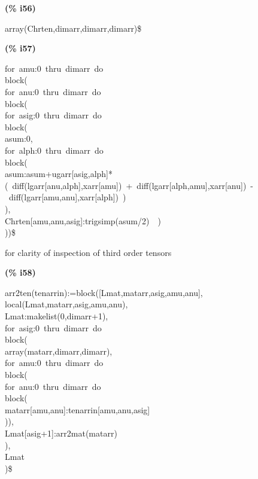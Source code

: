 \documentclass[fleqn]{article}
\begin{document}
\noindent
\begin{minipage}[t]{4.000000em}\color{red}\bfseries
(\% i56)	
\end{minipage}
\begin{minipage}[t]{\textwidth}\color{blue}
array(Chrten,dimarr,dimarr,dimarr)\$
\end{minipage}

\noindent%



\noindent
\begin{minipage}[t]{4.000000em}\color{red}\bfseries
(\% i57)	
\end{minipage}
\begin{minipage}[t]{\textwidth}\color{blue}
for\ amu:0\ thru\ dimarr\ do\\
block(\\
for\ anu:0\ thru\ dimarr\ do\\
block(\\
for\ asig:0\ thru\ dimarr\ do\\
block(\\
asum:0,\\
for\ alph:0\ thru\ dimarr\ do\\
block(\\
asum:asum+ugarr[asig,alph]*(\ diff(lgarr[anu,alph],xarr[amu])\ +\ diff(lgarr[alph,amu],xarr[anu])\ -\ diff(lgarr[amu,anu],xarr[alph])\ )\\
),\\
Chrten[amu,anu,asig]:trigsimp(asum/2)\ \ )\\
))\$
\end{minipage}

\noindent%

for clarity of inspection of third order tensors


\noindent
\begin{minipage}[t]{4.000000em}\color{red}\bfseries
(\% i58)	
\end{minipage}
\begin{minipage}[t]{\textwidth}\color{blue}
arr2ten(tenarrin):=block([Lmat,matarr,asig,amu,anu],\\
local(Lmat,matarr,asig,amu,anu),\\
Lmat:makelist(0,dimarr+1),\\
for\ asig:0\ thru\ dimarr\ do\\
block(\\
array(matarr,dimarr,dimarr),\\
for\ amu:0\ thru\ dimarr\ do\\
block(\\
for\ anu:0\ thru\ dimarr\ do\\
block(\\
matarr[amu,anu]:tenarrin[amu,anu,asig]\\
)),\\
Lmat[asig+1]:arr2mat(matarr)\\
),\\
Lmat\\
)\$
\end{minipage}
\end{document}
